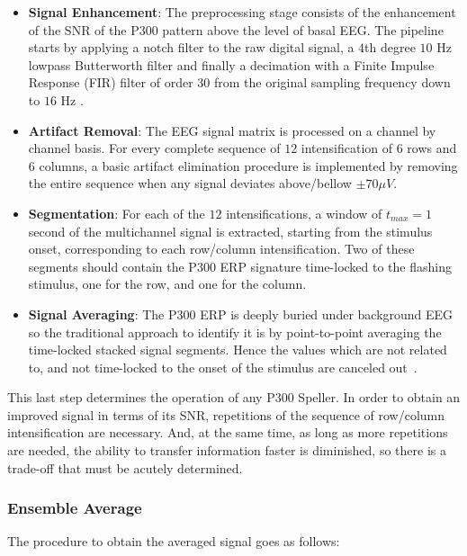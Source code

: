 \documentclass[utf8]{frontiersSCNS} %
\begin{document}
\begin{itemize}
\item \textbf{Signal Enhancement}: The preprocessing stage consists of the enhancement of the SNR of the P300 pattern above the level of basal EEG. The pipeline starts by applying a notch filter to the raw digital signal, a 
$4$th degree $10$ Hz lowpass Butterworth filter and finally a decimation with a Finite Impulse Response (FIR) filter of order $30$ from the original sampling frequency down to $16$ Hz \citep{Krusienski2006}.
\item \textbf{Artifact Removal}: The EEG signal matrix is processed on a channel by channel basis.   For every complete sequence of $12$ intensification of $6$ rows and $6$ columns, a basic artifact elimination procedure is implemented by removing the entire sequence when any signal deviates above/bellow $ \pm 70 \mu V $.
\item \textbf{Segmentation}: For each of the $12$ intensifications,  a window of $t_{max} = 1$ second of the multichannel signal is extracted, starting from the stimulus onset, corresponding to each row/column intensification.  Two of these segments should contain the P300 ERP signature time-locked to the flashing stimulus, one for the row, and one for the column.
\item \textbf{Signal Averaging}:  The P300 ERP is deeply buried under background EEG so the traditional approach to identify it is by point-to-point averaging the time-locked stacked signal segments.  Hence the values which are not related to, and not time-locked to the onset of the stimulus are canceled out~\citep{Liang2008}. 
\end{itemize}

This last step determines the operation of any P300 Speller.  In order to obtain an improved signal in terms of its SNR, repetitions of the sequence of row/column intensification are necessary.  And, at the same time, as long as more repetitions are needed, the ability to transfer information faster is diminished, so there is a trade-off that must be acutely determined.

\subsubsection{Ensemble Average} \label{Average}

The procedure to obtain the averaged signal goes as follows:
\end{document}
